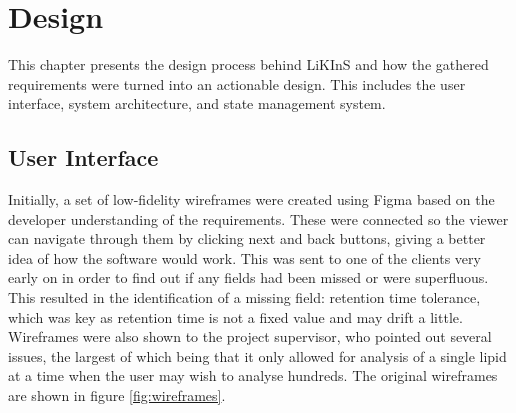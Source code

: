 \documentclass{l4proj}
\begin{document}
\chapter{Design}
This chapter presents the design process behind LiKInS and how the gathered requirements were turned into an actionable design. This includes the user interface, system architecture, and state management system.


\section{User Interface} \label{user-interface-design}
Initially, a set of low-fidelity wireframes were created using Figma based on the developer understanding of the requirements. These were connected so the viewer can navigate through them by clicking next and back buttons, giving a better idea of how the software would work. This was sent to one of the clients very early on in order to find out if any fields had been missed or were superfluous. This resulted in the identification of a missing field: retention time tolerance, which was key as retention time is not a fixed value and may drift a little. Wireframes were also shown to the project supervisor, who pointed out several issues, the largest of which being that it only allowed for analysis of a single lipid at a time when the user may wish to analyse hundreds. The original wireframes are shown in figure \ref{fig:wireframes}.
\end{document}
